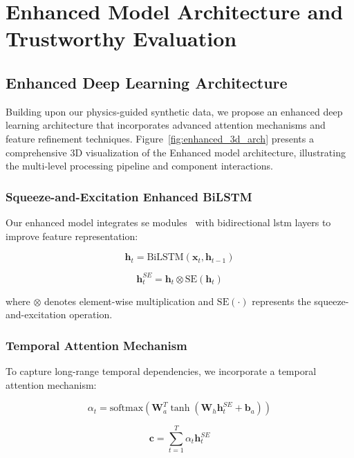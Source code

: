 \documentclass[journal]{IEEEtran}
\begin{document}
\section{Enhanced Model Architecture and Trustworthy Evaluation}

\subsection{Enhanced Deep Learning Architecture}

Building upon our physics-guided synthetic data, we propose an enhanced deep learning architecture that incorporates advanced attention mechanisms and feature refinement techniques. Figure~\ref{fig:enhanced_3d_arch} presents a comprehensive 3D visualization of the Enhanced model architecture, illustrating the multi-level processing pipeline and component interactions.

\subsubsection{Squeeze-and-Excitation Enhanced BiLSTM}

Our enhanced model integrates \gls{se} modules~\cite{se_networks2018} with bidirectional \gls{lstm} layers to improve feature representation:

\begin{equation}
\mathbf{h}_t = \text{BiLSTM}(\mathbf{x}_t, \mathbf{h}_{t-1})
\end{equation}

\begin{equation}
\mathbf{h}_t^{SE} = \mathbf{h}_t \otimes \text{SE}(\mathbf{h}_t)
\end{equation}

where $\otimes$ denotes element-wise multiplication and $\text{SE}(\cdot)$ represents the squeeze-and-excitation operation.

\subsubsection{Temporal Attention Mechanism}

To capture long-range temporal dependencies, we incorporate a temporal attention mechanism:

\begin{equation}
\alpha_t = \text{softmax}(\mathbf{W}_a^T \tanh(\mathbf{W}_h \mathbf{h}_t^{SE} + \mathbf{b}_a))
\end{equation}

\begin{equation}
\mathbf{c} = \sum_{t=1}^{T} \alpha_t \mathbf{h}_t^{SE}
\end{equation}
\end{document}
